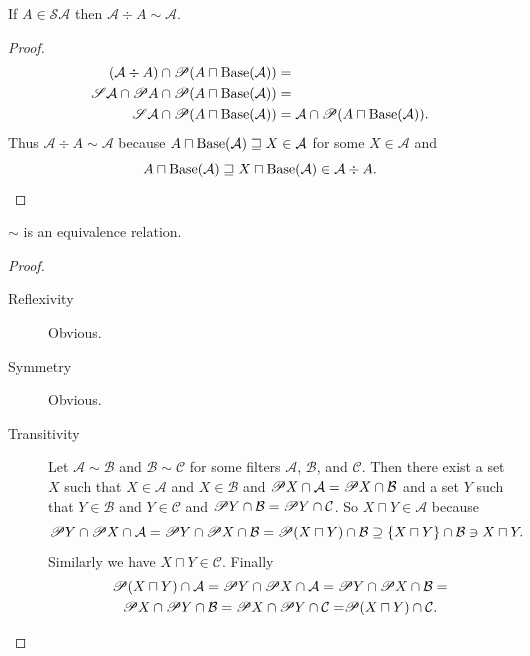 \begin{prop}\label{filteq-ext}
If $A\in\mathscr{S}\mathcal{A}$ then
$\mathcal{A}\div A\sim\mathcal{A}$.
\end{prop}
\begin{proof}
~
\begin{align*}
(\mathcal{A}\div A)\cap\mathscr{P}(A\sqcap\operatorname{Base}(\mathcal{A})) & =\\
\mathscr{S}\mathcal{A}\cap\mathscr{P} A\cap\mathscr{P}(A\sqcap\operatorname{Base}(\mathcal{A})) & =\\
\mathscr{S}\mathcal{A}\cap\mathscr{P}(A\sqcap\operatorname{Base}(\mathcal{A})) & =
\mathcal{A}\cap\mathscr{P}(A\sqcap\operatorname{Base}(\mathcal{A})).
\end{align*}
Thus $\mathcal{A}\div A\sim\mathcal{A}$ because $A\sqcap\operatorname{Base}(\mathcal{A})\sqsupseteq X\in\mathcal{A}$
for some $X\in\mathcal{A}$ and 
\[
A\sqcap\operatorname{Base}(\mathcal{A})\sqsupseteq X\sqcap\operatorname{Base}(\mathcal{A})\in\mathcal{A}\div A.
\]
\end{proof}

\begin{prop}
$\sim$ is an equivalence relation.
\end{prop}
\begin{proof}
~
\begin{description}
\item [{Reflexivity}] Obvious.
\item [{Symmetry}] Obvious.
\item [{Transitivity}] Let $\mathcal{A}\sim\mathcal{B}$ and $\mathcal{B}\sim\mathcal{C}$
for some filters $\mathcal{A}$, $\mathcal{B}$, and $\mathcal{C}$.
Then there exist a set $X$ such that $X\in\mathcal{A}$ and $X\in\mathcal{B}$
and $\mathscr{P} X\cap\mathcal{A}=\mathscr{P} X\cap\mathcal{B}$ and a set
$Y$ such that $Y\in\mathcal{B}$ and $Y\in\mathcal{C}$ and $\mathscr{P} Y\cap\mathcal{B}=\mathscr{P} Y\cap\mathcal{C}$.
So $X\sqcap Y\in\mathcal{A}$ because
\[
\mathscr{P} Y\cap\mathscr{P} X\cap\mathcal{A}=\mathscr{P} Y\cap\mathscr{P} X\cap\mathcal{B}=\mathscr{P}(X\sqcap Y)\cap\mathcal{B}\supseteq\{X\sqcap Y\}\cap\mathcal{B}\ni X\sqcap Y.
\]
Similarly we have $X\sqcap Y\in\mathcal{C}$. Finally
\begin{multline*}
\mathscr{P}(X\sqcap Y)\cap\mathcal{A}=\mathscr{P} Y\cap\mathscr{P} X\cap\mathcal{A}=\mathscr{P} Y\cap\mathscr{P} X\cap\mathcal{B}=\\
\mathscr{P} X\cap\mathscr{P} Y\cap\mathcal{B}=\mathscr{P} X\cap\mathscr{P} Y\cap\mathcal{C=}\mathscr{P}(X\sqcap Y)\cap\mathcal{C}.
\end{multline*}

\end{description}
\end{proof}

